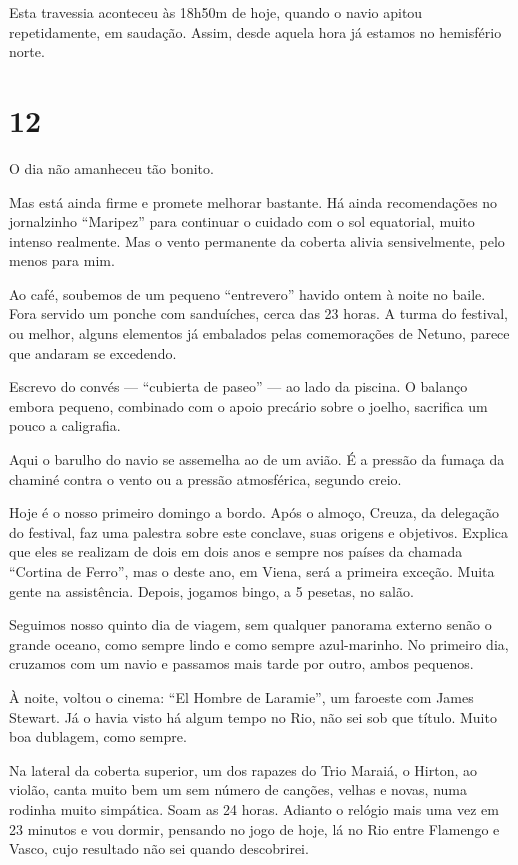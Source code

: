 Esta travessia aconteceu às 18h50m de hoje, quando o navio apitou repetidamente, em saudação. Assim, desde aquela hora já estamos no hemisfério norte.

\section*{12 \adfflatleafright {}}

O dia não amanheceu tão bonito.

Mas está ainda firme e promete melhorar bastante. Há ainda recomendações no jornalzinho ``Maripez'' para continuar o cuidado com o sol equatorial, muito intenso realmente. Mas o vento permanente da coberta alivia sensivelmente, pelo menos para mim.

Ao café, soubemos de um pequeno ``entrevero'' havido ontem à noite no baile. Fora servido um ponche com sanduíches, cerca das 23 horas. A turma do festival, ou melhor, alguns elementos já embalados pelas comemorações de Netuno, parece que andaram se excedendo.

Escrevo do convés --- ``cubierta de paseo'' --- ao lado da piscina. O balanço embora pequeno, combinado com o apoio precário sobre o joelho, sacrifica um pouco a caligrafia.

Aqui o barulho do navio se assemelha ao de um avião. É a pressão da fumaça da chaminé contra o vento ou a pressão atmosférica, segundo creio.

Hoje é o nosso primeiro domingo a bordo. Após o almoço, Creuza, da delegação do festival, faz uma palestra sobre este conclave, suas origens e objetivos. Explica que eles se realizam de dois em dois anos e sempre nos países da chamada ``Cortina de Ferro'', mas o deste ano, em Viena, será a primeira exceção. Muita gente na assistência. Depois, jogamos bingo, a 5 pesetas, no salão.

Seguimos nosso quinto dia de viagem, sem qualquer panorama externo senão o grande oceano, como sempre lindo e como sempre azul-marinho. No primeiro dia, cruzamos com um navio e passamos mais tarde por outro, ambos pequenos.

À noite, voltou o cinema: ``El Hombre de Laramie'', um faroeste com James Stewart. Já o havia visto há algum tempo no Rio, não sei sob que título. Muito boa dublagem, como sempre.

Na lateral da coberta superior, um dos rapazes do Trio Maraiá, o Hirton, ao violão, canta muito bem um sem número de canções, velhas e novas, numa rodinha muito simpática. Soam as 24 horas. Adianto o relógio mais uma vez em 23 minutos e vou dormir, pensando no jogo de hoje, lá no Rio entre Flamengo e Vasco, cujo resultado não sei quando descobrirei.

